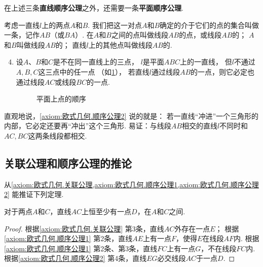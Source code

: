 在上述三条{\bf 直线顺序公理}之外，还需要一条{\bf 平面顺序公理}.

\begin{axiom}[顺序公理II]\label{axiom:欧式几何.顺序公理2}
考虑一直线\(l\)上的两点\(A\)和\(B\).
我们把这一对点\(A\)和\(B\)确定的介于它们的点的集合叫做一条，记作\(AB\)（或\(BA\)）.
在\(A\)和\(B\)之间的点叫做线段\(AB\)的点，或线段\(AB\)的；
\(A\)和\(B\)叫做线段\(AB\)的；
直线\(l\)上的其他点叫做线段\(AB\)的.
\begin{enumerate}
	\setcounter{enumi}{3}
	\item 设\(A\)、\(B\)和\(C\)是不在同一直线上的三点，
	\(l\)是平面\(ABC\)上的一直线，
	但\(l\)不通过\(A,B,C\)这三点中的任一点
	（如\cref{figure:欧式几何.平面上点的顺序1}），
	若直线\(l\)通过线段\(AB\)的一点，则它必定也通过线段\(AC\)或线段\(BC\)的一点.
	\begin{figure}[ht]
		\centering
		\caption{平面上点的顺序}
		\label{figure:欧式几何.平面上点的顺序1}
	\end{figure}
\end{enumerate}
\end{axiom}
直观地说，\cref{axiom:欧式几何.顺序公理2} 说的就是：
若一直线“冲进”一个三角形的内部，它必定还要再“冲出”这个三角形.
易证：与线段\(AB\)相交的直线\(l\)不同时和\(AC,BC\)这两条线段都相交.

\subsection{关联公理和顺序公理的推论}
从\cref{axiom:欧式几何.关联公理,axiom:欧式几何.顺序公理1,axiom:欧式几何.顺序公理2} 能推证下列定理.
\begin{theorem}\label{theorem:欧式几何.定理3}
对于两点\(A\)和\(C\)，直线\(AC\)上恒至少有一点\(D\)，在\(A\)和\(C\)之间.
\begin{proof}
根据\cref{axiom:欧式几何.关联公理} 第3条，直线\(AC\)外存在一点\(E\)；
根据\cref{axiom:欧式几何.顺序公理1} 第2条，直线\(AE\)上有一点\(F\)，使得\(E\)在线段\(AF\)内.
根据\cref{axiom:欧式几何.顺序公理1} 第2条、第3条，直线\(FC\)上有一点\(G\)，不在线段\(FC\)内.
根据\cref{axiom:欧式几何.顺序公理2} 第4条，直线\(EG\)必交线段\(AC\)于一点\(D\).
\end{proof}
\end{theorem}


